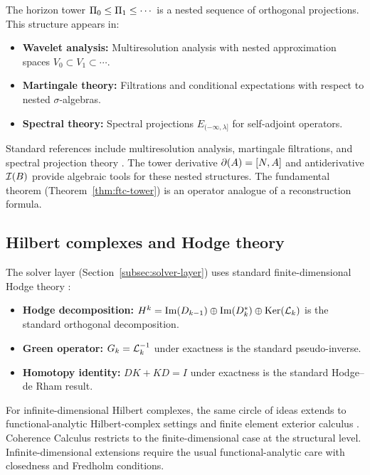 The horizon tower $\Pi_{0} \le \Pi_{1} \le \cdots$ is a nested sequence of orthogonal projections.
This structure appears in:
\begin{itemize}[itemsep=0.2em]
\item \textbf{Wavelet analysis:} Multiresolution analysis with nested approximation spaces $V_0 \subset V_1 \subset \cdots$.
\item \textbf{Martingale theory:} Filtrations and conditional expectations with respect to nested $\sigma$-algebras.
\item \textbf{Spectral theory:} Spectral projections $E_{(-\infty, \lambda]}$ for self-adjoint operators.
\end{itemize}
Standard references include multiresolution analysis, martingale filtrations,
and spectral projection theory \cite{Mallat1989,Daubechies1992,Doob1953,ReedSimon1972}.
The tower derivative $\partial(A) = [N, A]$ and antiderivative
$\mathcal{I}(B)$ provide algebraic tools for these nested structures. The
fundamental theorem (Theorem~\ref{thm:ftc-tower}) is an operator analogue of a
reconstruction formula.

\subsection{Hilbert complexes and Hodge theory}
\label{subsec:hodge}

The solver layer (Section~\ref{subsec:solver-layer}) uses standard finite-dimensional Hodge theory
\cite{ArnoldFalkWinther2006,Schwarz1995,Warner1983}:
\begin{itemize}[itemsep=0.2em]
\item \textbf{Hodge decomposition:} $H^k = \mathrm{Im}(D_{k-1}) \oplus \mathrm{Im}(D_k^*) \oplus \mathrm{Ker}(\mathcal{L}_k)$ is the standard orthogonal decomposition.
\item \textbf{Green operator:} $G_{k} = \mathcal{L}_k^{-1}$ under exactness is the standard pseudo-inverse.
\item \textbf{Homotopy identity:} $DK + KD = I$ under exactness is the standard Hodge--de Rham result.
\end{itemize}
For infinite-dimensional Hilbert complexes, the same circle of ideas extends to
functional-analytic Hilbert-complex settings and finite element exterior
calculus \cite{ArnoldFalkWinther2006}.
Coherence Calculus restricts to the finite-dimensional case at the structural
level. Infinite-dimensional extensions require the usual functional-analytic
care with closedness and Fredholm conditions.


